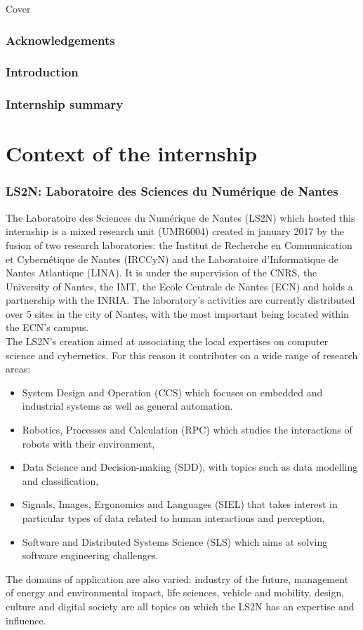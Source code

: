\documentclass[12pt,times,onecolumn]{article}
\begin{document}
Cover
\clearpage
\section*{Acknowledgements}
\clearpage
\section*{Introduction}
\clearpage
\section*{Internship summary}
\clearpage
\tableofcontents
\clearpage



\part{Context of the internship}
\section{LS2N: Laboratoire des Sciences du Numérique de Nantes}
The Laboratoire des Sciences du Numérique de Nantes (LS2N) which hosted this internship is a mixed research unit (UMR6004) created in january 2017 by the fusion of two research laboratories: the Institut de Recherche en Communication et Cybernétique de Nantes (IRCCyN) and the Laboratoire d'Informatique de Nantes Atlantique (LINA). It is under the supervision of the CNRS, the University of Nantes, the IMT, the Ecole Centrale de Nantes (ECN) and holds a partnership with the INRIA. The laboratory's activities are currently distributed over 5 sites in the city of Nantes, with the most important being located within the ECN's campus.\\

The LS2N's creation aimed at associating the local expertises on computer science and cybernetics. For this reason it contributes on a wide range of research areas:
\begin{itemize}
\item System Design and Operation (CCS) which focuses on embedded and industrial systems as well as general automation.
\item Robotics, Processes and Calculation (RPC) which studies the interactions of robots with their environment,
\item Data Science and Decision-making (SDD), with topics such as data modelling and classification,
\item Signals, Images, Ergonomics and Languages (SIEL) that takes interest in particular types of data related to human interactions and perception,
\item Software and Distributed Systems Science (SLS) which aims at solving software engineering challenges.
\end{itemize}
The domains of application are also varied: industry of the future, management of energy and environmental impact, life sciences, vehicle and mobility, design, culture and digital society are all topics on which the LS2N has an expertise and influence.\\
\end{document}

